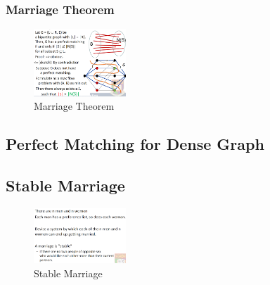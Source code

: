 \subsubsection{Marriage Theorem}
\begin{figure}[H]
    \centering
    \includegraphics[width=0.309\textwidth]{pic/DAA10/Marriage Theorem}
    \caption{Marriage Theorem}
\end{figure}


\subsection{Perfect Matching for Dense Graph}



\subsection{Stable Marriage}
\begin{figure}[H]
    \centering
    \includegraphics[width=0.309\textwidth]{pic/DAA10/Stable Marriage}
    \caption{Stable Marriage}
\end{figure}


